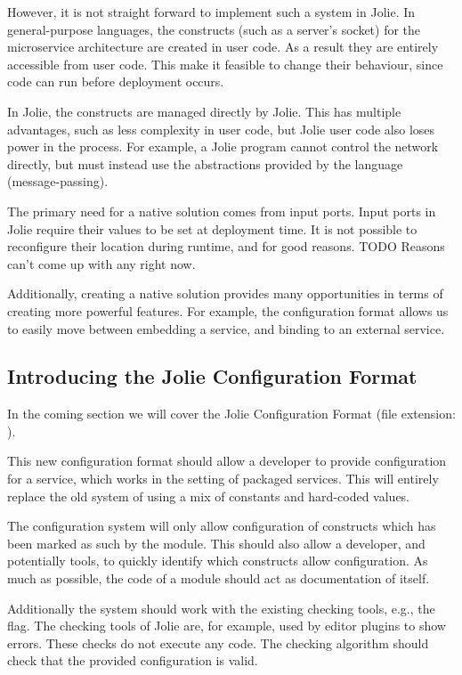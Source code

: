 
However, it is not straight forward to implement such a system in Jolie.
In general-purpose languages, the constructs (such as a server's socket) for
the microservice architecture are created in user code. As a result they are
entirely accessible from user code. This make it feasible to change their
behaviour, since code can run before deployment occurs.

In Jolie, the constructs are managed directly by Jolie. This has multiple
advantages, such as less complexity in user code, but Jolie user code also
loses power in the process. For example, a Jolie program cannot control the
network directly, but must instead use the abstractions provided by the
language (message-passing).

The primary need for a native solution comes from input ports. Input ports in
Jolie require their values to be set at deployment time. It is not possible to
reconfigure their location during runtime, and for good reasons. TODO Reasons
can't come up with any right now.

Additionally, creating a native solution provides many opportunities in terms of
creating more powerful features. For example, the configuration format allows
us to easily move between embedding a service, and binding to an external
service.

\subsection{Introducing the Jolie Configuration Format}
\label{sec:conf_units}

In the coming section we will cover the Jolie Configuration Format (file
extension: ).


This new configuration format should allow a developer to provide configuration
for a service, which works in the setting of packaged services. This will
entirely replace the old system of using a mix of constants and hard-coded
values.

The configuration system will only allow configuration of constructs which has
been marked as such by the module. This should also allow a developer, and
potentially tools, to quickly identify which constructs allow configuration.
As much as possible, the code of a module should act as documentation of
itself.

Additionally the system should work with the existing checking tools, e.g., the
 flag. The checking tools of Jolie are, for example, used by
editor plugins to show errors. These checks do not execute any code. The
checking algorithm should check that the provided configuration is valid.

